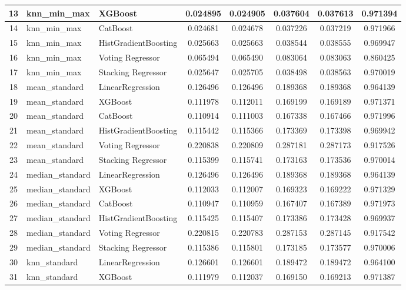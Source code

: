 \documentclass[10pt,letterpaper]{article}
\begin{document}
\begin{landscape}
\begin{table}[H]
\begin{tabular}{|c|l|l|c|c|c|c|c|}
13 & knn\_min\_max & XGBoost & 0.024895 & 0.024905 & 0.037604 & 0.037613 & 0.971394 \\ \hline
14 & knn\_min\_max & CatBoost & 0.024681 & 0.024678 & 0.037226 & 0.037219 & 0.971966 \\ \hline
15 & knn\_min\_max & HistGradientBoosting & 0.025663 & 0.025663 & 0.038544 & 0.038555 & 0.969947 \\ \hline
16 & knn\_min\_max & Voting Regressor & 0.065494 & 0.065490 & 0.083064 & 0.083063 & 0.860425 \\ \hline
17 & knn\_min\_max & Stacking Regressor & 0.025647 & 0.025705 & 0.038498 & 0.038563 & 0.970019 \\ \hline
18 & mean\_standard & LinearRegression & 0.126496 & 0.126496 & 0.189368 & 0.189368 & 0.964139 \\ \hline
19 & mean\_standard & XGBoost & 0.111978 & 0.112011 & 0.169199 & 0.169189 & 0.971371 \\ \hline
20 & mean\_standard & CatBoost & 0.110914 & 0.111003 & 0.167338 & 0.167466 & 0.971996 \\ \hline
21 & mean\_standard & HistGradientBoosting & 0.115442 & 0.115366 & 0.173369 & 0.173398 & 0.969942 \\ \hline
22 & mean\_standard & Voting Regressor & 0.220838 & 0.220809 & 0.287181 & 0.287173 & 0.917526 \\ \hline
23 & mean\_standard & Stacking Regressor & 0.115399 & 0.115741 & 0.173163 & 0.173536 & 0.970014 \\ \hline
24 & median\_standard & LinearRegression & 0.126496 & 0.126496 & 0.189368 & 0.189368 & 0.964139 \\ \hline
25 & median\_standard & XGBoost & 0.112033 & 0.112007 & 0.169323 & 0.169222 & 0.971329 \\ \hline
26 & median\_standard & CatBoost & 0.110947 & 0.110959 & 0.167407 & 0.167389 & 0.971973 \\ \hline
27 & median\_standard & HistGradientBoosting & 0.115425 & 0.115407 & 0.173386 & 0.173428 & 0.969937 \\ \hline
28 & median\_standard & Voting Regressor & 0.220815 & 0.220783 & 0.287153 & 0.287145 & 0.917542 \\ \hline
29 & median\_standard & Stacking Regressor & 0.115386 & 0.115801 & 0.173185 & 0.173577 & 0.970006 \\ \hline
30 & knn\_standard & LinearRegression & 0.126601 & 0.126601 & 0.189472 & 0.189472 & 0.964100 \\ \hline
31 & knn\_standard & XGBoost & 0.111979 & 0.112037 & 0.169150 & 0.169213 & 0.971387 \\ \hline

\end{tabular}
\end{table}
\end{landscape}
\end{document}
